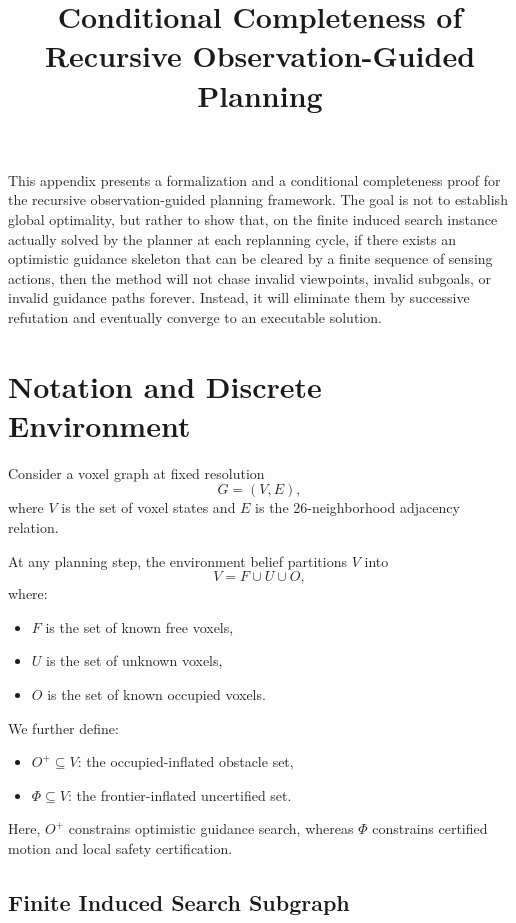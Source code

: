 \documentclass[11pt]{article}
\title{Conditional Completeness of Recursive Observation-Guided Planning}
\author{}
\date{}
\begin{document}
\maketitle

This appendix presents a formalization and a conditional completeness proof for the recursive observation-guided planning framework. The goal is not to establish global optimality, but rather to show that, on the finite induced search instance actually solved by the planner at each replanning cycle, if there exists an optimistic guidance skeleton that can be cleared by a finite sequence of sensing actions, then the method will not chase invalid viewpoints, invalid subgoals, or invalid guidance paths forever. Instead, it will eliminate them by successive refutation and eventually converge to an executable solution.

\section{Notation and Discrete Environment}

Consider a voxel graph at fixed resolution
\[
G=(V,E),
\]
where $V$ is the set of voxel states and $E$ is the 26-neighborhood adjacency relation.

At any planning step, the environment belief partitions $V$ into
\[
V = F \cup U \cup O,
\]
where:
\begin{itemize}[leftmargin=2em]
    \item $F$ is the set of known free voxels,
    \item $U$ is the set of unknown voxels,
    \item $O$ is the set of known occupied voxels.
\end{itemize}

We further define:
\begin{itemize}[leftmargin=2em]
    \item $O^{+}\subseteq V$: the occupied-inflated obstacle set,
    \item $\Phi\subseteq V$: the frontier-inflated uncertified set.
\end{itemize}

Here, $O^{+}$ constrains optimistic guidance search, whereas $\Phi$ constrains certified motion and local safety certification.

\subsection{Finite Induced Search Subgraph}
\end{document}
